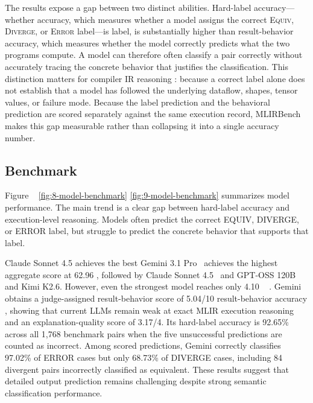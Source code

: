 \documentclass[sigplan,screen,review,anonymous]{acmart}
\providecommand{\DIFadd}[1]{{\protect\color{blue} \sf #1}} %
\providecommand{\DIFdel}[1]{{\protect\color{red} \scriptsize #1}} %
\providecommand{\DIFaddbegin}{} %
\providecommand{\DIFaddend}{} %
\providecommand{\DIFdelbegin}{} %
\providecommand{\DIFdelend}{} %
\begin{document}
The results expose a gap between two distinct abilities. Hard-label \DIFdelbegin \DIFdel{accuracy---whether }\DIFdelend \DIFaddbegin \DIFadd{accuracy, which measures whether }\DIFaddend a model assigns the correct \textsc{Equiv}, \textsc{Diverge}, or \textsc{Error} \DIFdelbegin \DIFdel{label---is }\DIFdelend \DIFaddbegin \DIFadd{label, is }\DIFaddend substantially higher than result-behavior accuracy, which measures whether the model correctly predicts what the two programs compute. A model can therefore often classify a pair correctly without accurately tracing the concrete behavior that justifies the classification. This distinction matters for compiler IR reasoning \DIFdelbegin \DIFdel{: }\DIFdelend \DIFaddbegin \DIFadd{because }\DIFaddend a correct label alone does not establish that a model has followed the underlying dataflow, shapes, tensor values, or failure mode. Because the label prediction and the behavioral prediction are scored separately against the same execution record, MLIRBench makes this gap measurable rather than collapsing it into a single accuracy number.


\subsection{Benchmark}

Figure ~\DIFdelbegin \DIFdel{\ref{fig:8-model-benchmark} }\DIFdelend \DIFaddbegin \DIFadd{\ref{fig:9-model-benchmark} }\DIFaddend summarizes model performance. The main trend is a clear gap between hard-label accuracy and execution-level reasoning. Models often predict the correct \textsc{EQUIV}, \textsc{DIVERGE}, or \textsc{ERROR} label, but struggle to predict the concrete behavior that supports that label.

\DIFdelbegin \DIFdel{Claude Sonnet 4.5 achieves the best }\DIFdelend \DIFaddbegin \DIFadd{Gemini 3.1 Pro~\cite{google2026gemini31pro} achieves the highest }\DIFaddend aggregate score at \DIFdelbegin \DIFdel{62.96}\DIFdelend \DIFaddbegin \DIFadd{74.18}\DIFaddend , followed by \DIFaddbegin \DIFadd{Claude Sonnet 4.5~\cite{anthropic2025sonnet45}  and }\DIFaddend GPT-OSS 120B\DIFdelbegin \DIFdel{and Kimi K2.6. However, even the strongest model reaches only 4.10}\DIFdelend \DIFaddbegin \DIFadd{~\cite{openai2025gptoss} . Gemini obtains a judge-assigned result-behavior score of 5.04}\DIFaddend /10 \DIFdelbegin \DIFdel{result-behavior accuracy , showing that current LLMs remain weak at exact MLIR execution reasoning}\DIFdelend \DIFaddbegin \DIFadd{and an explanation-quality score of 3.17/4. Its hard-label accuracy is 92.65\% across all 1,768 benchmark pairs when the five unsuccessful predictions are counted as incorrect. Among scored predictions, Gemini correctly classifies 97.02\% of \textsc{ERROR} cases but only 68.73\% of \textsc{DIVERGE} cases, including 84 divergent pairs incorrectly classified as equivalent. These results suggest that detailed output prediction remains challenging despite strong semantic classification performance}\DIFaddend .
\end{document}
